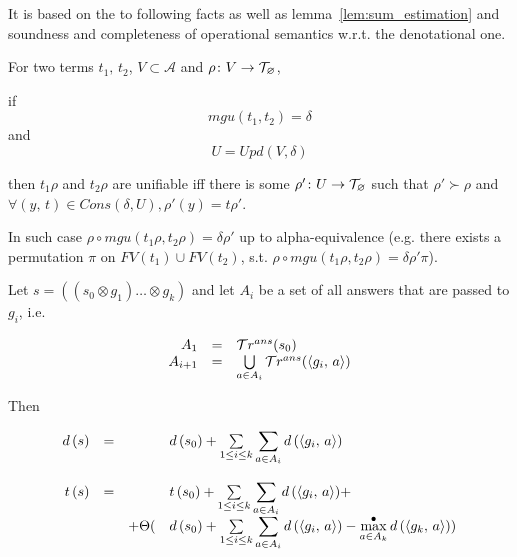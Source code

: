 It is based on the to following facts as well as lemma~\ref{lem:sum_estimation} and soundness and completeness of operational semantics w.r.t. the denotational one.

\begin{lemma}
For two terms $t_1, \,t_2$, $V \subset \mathcal{A}$ and $\rho \colon V \to \mathcal{T}_{\varnothing}$,

if \[ mgu(t_1, t_2) = \delta \] and \[ U = Upd(V, \delta) \]

then $t_1 \rho$ and $t_2 \rho$ are unifiable iff there is some $\rho' \colon U \to \mathcal{T}_{\varnothing}$ such that $\rho' \succ \rho$ and $\forall (y, \, t) \in Cons(\delta, U), \rho'(y) = t \rho'$.

In such case $ \rho \circ mgu(t_1 \rho, t_2 \rho) = \delta \rho' $ up to alpha-equivalence (e.g. there exists a permutation $\pi$ on $FV(t_1) \cup FV(t_2)$, s.t. $ \rho \circ mgu(t_1 \rho, t_2 \rho) = \delta \rho' \pi$).
\end{lemma}
 
 \begin{lemma}
\label{lem:conjunction_metrics_calc}

Let $s = ((s_0 \otimes g_1) \dots \otimes g_k)$ and let $A_i$ be a set of all answers that are passed to $g_i$, i.e.

\[
\begin{array}{rcl}
A_1 &=& \mathcal{T}r^{ans}(s_0) \\
A_{i + 1} & = & \bigcup\limits_{a \in A_i} \mathcal{T}r^{ans}(\langle g_i ,\, a \rangle) 
\end{array}
\]

Then

\[
\begin{array}{rcrl}
d\,(s) &=& & d\,(s_0) + \sum\limits_{1 \le i \le k} \displaystyle\sum\limits_{a \in A_i} d\,(\langle g_i ,\, a \rangle) \\
\\
t\,(s) &=& & t\,(s_0) + \sum\limits_{1 \le i \le k} \displaystyle\sum\limits_{a \in A_i} d\,(\langle g_i ,\, a \rangle) + \\
& & + \Theta( & d\,(s_0) + \sum\limits_{1 \le i \le k} \displaystyle\sum\limits_{a \in A_i} d\,(\langle g_i ,\, a \rangle) - \max^{\bullet}\limits_{a \in A_k}  d\,(\langle g_k ,\, a \rangle)) \\
\end{array}
\]

\end{lemma}
 
 
 
 
 
 
 
 
 
